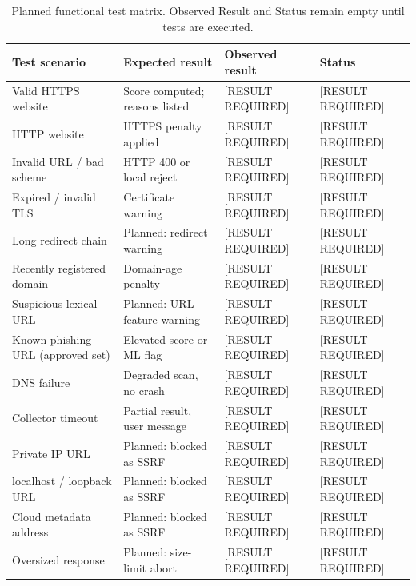 \begin{table}[!t]
\centering
\caption{Planned functional test matrix.
Observed Result and Status remain empty until tests are executed.}
\label{tab:functional}
\begin{tabular}{p{3.6cm}p{4.2cm}p{4.2cm}l}
\toprule
Test scenario & Expected result & Observed result & Status \\
\midrule
Valid HTTPS website & Score computed; reasons listed & [RESULT REQUIRED] & [RESULT REQUIRED] \\
HTTP website & HTTPS penalty applied & [RESULT REQUIRED] & [RESULT REQUIRED] \\
Invalid URL / bad scheme & HTTP 400 or local reject & [RESULT REQUIRED] & [RESULT REQUIRED] \\
Expired / invalid TLS & Certificate warning & [RESULT REQUIRED] & [RESULT REQUIRED] \\
Long redirect chain & Planned: redirect warning & [RESULT REQUIRED] & [RESULT REQUIRED] \\
Recently registered domain & Domain-age penalty & [RESULT REQUIRED] & [RESULT REQUIRED] \\
Suspicious lexical URL & Planned: URL-feature warning & [RESULT REQUIRED] & [RESULT REQUIRED] \\
Known phishing URL (approved set) & Elevated score or ML flag & [RESULT REQUIRED] & [RESULT REQUIRED] \\
DNS failure & Degraded scan, no crash & [RESULT REQUIRED] & [RESULT REQUIRED] \\
Collector timeout & Partial result, user message & [RESULT REQUIRED] & [RESULT REQUIRED] \\
Private IP URL & Planned: blocked as SSRF & [RESULT REQUIRED] & [RESULT REQUIRED] \\
localhost / loopback URL & Planned: blocked as SSRF & [RESULT REQUIRED] & [RESULT REQUIRED] \\
Cloud metadata address & Planned: blocked as SSRF & [RESULT REQUIRED] & [RESULT REQUIRED] \\
Oversized response & Planned: size-limit abort & [RESULT REQUIRED] & [RESULT REQUIRED] \\
\bottomrule
\end{tabular}
\end{table}
